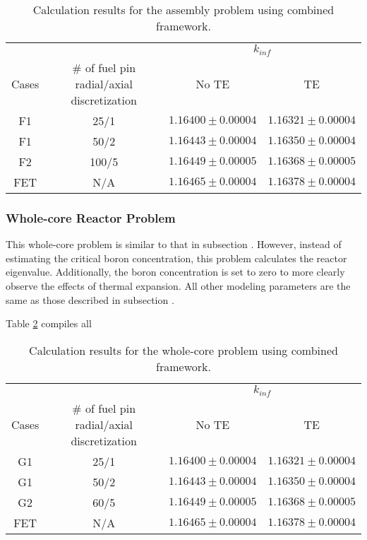\begin{table}[b!]
    \centering
    \caption{Calculation results for the assembly problem using combined framework.}
    \label{tab431} 
    \begin{tabular}{| c | c | c | c | }
    \hline 
       &   & \multicolumn{2}{c|}{$k_{inf}$}       \\
    \cline{3-4}
     Cases & \# of fuel pin radial/axial discretization & No TE & TE \\
     \hline
     F1     & 25/1  & $1.16400\pm0.00004$ & $1.16321\pm0.00004$      \\ \hline
     F1     & 50/2  & $1.16443\pm0.00004$ & $1.16350\pm0.00004$      \\ \hline
     F2     & 100/5 & $1.16449\pm0.00005$ & $1.16368\pm0.00005$      \\ \hline
     FET    & N/A   & $1.16465\pm0.00004$ & $1.16378\pm0.00004$      \\ \hline
    \end{tabular}
\end{table}

\subsubsection{Whole-core Reactor Problem}

This whole-core problem is similar to that in subsection \label{wc}. However, instead of estimating the critical boron concentration, this problem calculates the reactor eigenvalue. Additionally, the boron concentration is set to zero to more clearly observe the effects of thermal expansion. All other modeling parameters are the same as those described in subsection \label{wc}.

Table \ref{tab432} compiles all 

\begin{table}
    \centering
    \caption{Calculation results for the whole-core problem using combined framework.}
    \label{tab432} 
    \begin{tabular}{| c | c | c | c | }
    \hline 
       &   & \multicolumn{2}{c|}{$k_{inf}$}       \\
    \cline{3-4}
     Cases & \# of fuel pin radial/axial discretization & No TE & TE \\
     \hline
     G1     & 25/1  & $1.16400\pm0.00004$ & $1.16321\pm0.00004$      \\ \hline
     G1     & 50/2  & $1.16443\pm0.00004$ & $1.16350\pm0.00004$      \\ \hline
     G2     & 60/5  & $1.16449\pm0.00005$ & $1.16368\pm0.00005$      \\ \hline
     FET    & N/A   & $1.16465\pm0.00004$ & $1.16378\pm0.00004$      \\ \hline
    \end{tabular}
\end{table}